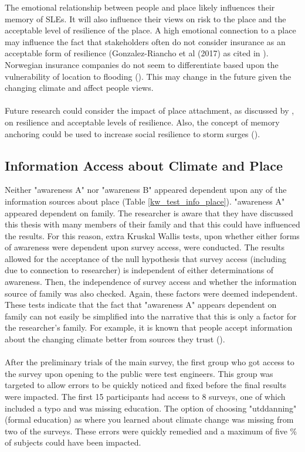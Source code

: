 The emotional relationship between people and place likely influences their memory of SLEs. It will also influence their views on risk to the place and the acceptable level of resilience of the place. A high emotional connection to a place may influence the fact that stakeholders often do not consider insurance as an acceptable form of resilience (Gonzalez-Riancho et al (2017) as cited in \cite{gerkensmeier_governing_2018}). Norwegian insurance companies do not seem to differentiate based upon the vulnerability of location to flooding (\cite{lujala_role_2020}). This may change in the future given the changing climate and affect people views.
\paragraph{}
Future research could consider the impact of place attachment, as discussed by \cite{ariccio_place_2021}, on resilience and acceptable levels of resilience. Also, the concept of memory anchoring could be used to increase social resilience to storm surges (\cite{de_guttry_expiry_2022}).  


\subsection{Information Access about Climate and Place}
Neither "awareness A" nor "awareness B" appeared dependent upon any of the information sources about place  (Table \ref{kw_test_info_place}). "awareness A" appeared dependent on family. The researcher is aware that they have discussed this thesis with many members of their family and that this could have influenced the results. For this reason, extra Kruskal Wallis tests, upon whether either forms of awareness were dependent upon survey access, were conducted. The results allowed for the acceptance of the null hypothesis that survey access (including due to connection to researcher) is independent of either determinations of awareness. Then, the independence of survey access and whether the information source of family was also checked. Again, these factors were deemed independent. These tests indicate that the fact that "awareness A" appears dependent on family can not easily be simplified into the narrative that this is only a factor for the researcher's family. For example, it is known that people accept information about the changing climate better from sources they trust (\cite{corner_a_principles_2018}). 
\paragraph{}
After the preliminary trials of the main survey, the first group who got access to the survey upon opening to the public were test engineers. This group was targeted to allow errors to be quickly noticed and fixed before the final results were impacted. The first 15 participants had access to 8 surveys, one of which included a typo and was missing education. The option of choosing "utddanning" (formal education) as where you learned about climate change was missing from two of the surveys. These errors were quickly remedied and a maximum of five \% of subjects could have been impacted. 

